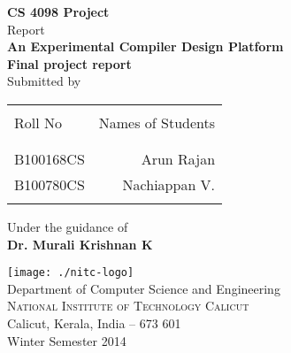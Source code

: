 \begin{titlepage}

\begin{center}

\textup{\small {\bf CS 4098 Project} \\ Report}\\[0.2in]

\Large \textbf {An Experimental Compiler Design Platform}\\[0.5in]

       

       {\bf Final project report}\\[0.5in]

\normalsize Submitted by \\
\begin{table}[h]
\centering
\begin{tabular}{lr}\hline \\
Roll No & Names of Students \\ \\ \hline
\\
B100168CS & Arun Rajan \\
B100780CS & Nachiappan V. \\ \\ \hline 
\end{tabular}
\end{table}

\vspace{.1in}
Under the guidance of\\
{\textbf{Dr. Murali Krishnan K}}\\[0.2in]

\vfill

\texttt{[image: ./nitc-logo]}\\[0.1in]
\Large{Department of Computer Science and Engineering}\\
\normalsize
\textsc{National Institute of Technology Calicut}\\
Calicut, Kerala, India -- 673 601 \\
\vspace{0.2cm}
Winter Semester 2014

\end{center}

\end{titlepage}
